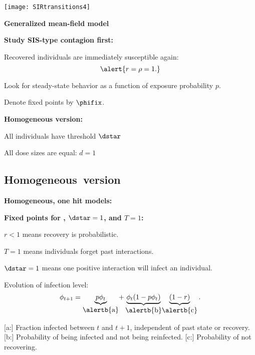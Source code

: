    \texttt{[image: SIRtransitions4]}






  \textbf{Generalized mean-field model}

  \textbf{Study SIS-type contagion first:}
    
    
      Recovered individuals are immediately susceptible again:
      $$
      \alert{r=\rho=1.}
      $$
    
      Look for steady-state behavior 
      as a function of exposure probability $p$.
    
      Denote fixed points by $\phifix$.
    
  
  
  \textbf{Homogeneous version:}
    
    
      All individuals have threshold $\dstar$
    
      All dose sizes are equal: $d=1$
    
  



\subsection{Homogeneous\ version}

  \textbf{Homogeneous, one hit models:}

  \textbf{Fixed points for , $\dstar=1$, and $T=1$:}
    
    
      \alert{$r<1$} means recovery is probabilistic.
    
      \alert{$T=1$} means individuals forget past interactions.
    
      \alert{$\dstar=1$} means one positive interaction 
      will infect an individual.
     
      Evolution of infection level:
      $$
      \phi_{t+1} = 
      {
        \underbrace{p \phi_{t}}_{\mbox{\alertb{a}}}
      }
      {
        + 
        \underbrace{\phi_t(1 - p\phi_t)}_{\mbox{\alertb{b}}}
      }
      {
        \underbrace{(1-r)}_{\mbox{\alertb{c}}}.
      }
      $$
      
      {
      [a:]
        Fraction infected between $t$ and $t+1$,
        independent of past state or recovery.
        }
      {
      [b:]
         Probability of being infected and not being reinfected.
      }
      {
      [c:]
        Probability of not recovering.
      }
      
